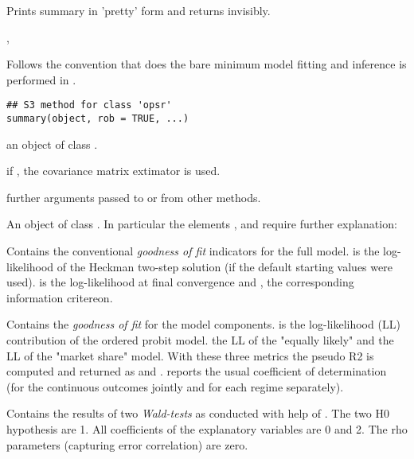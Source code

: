 \documentclass[letterpaper]{book}
\begin{document}
%
\begin{Value}
Prints summary in 'pretty' form and returns  invisibly.
\end{Value}
%
\begin{SeeAlso}
, 
\end{SeeAlso}
%
\begin{Description}
Follows the convention that  does the bare minimum model fitting and
inference is performed in .
\end{Description}
%
\begin{Usage}
\begin{verbatim}
## S3 method for class 'opsr'
summary(object, rob = TRUE, ...)
\end{verbatim}
\end{Usage}
%
\begin{Arguments}
\begin{ldescription}
\item[\code{object}] an object of class .

\item[\code{rob}] if , the  covariance matrix extimator is used.

\item[\code{...}] further arguments passed to or from other methods.
\end{ldescription}
\end{Arguments}
%
\begin{Value}
An object of class .
In particular the elements ,  and  require further
explanation:
\begin{ldescription}
\item[\code{GOF}] Contains the conventional \emph{goodness of fit} indicators for the full
model.  is the log-likelihood of the Heckman two-step solution (if
the default starting values were used).  is the log-likelihood at
final convergence and ,  the corresponding information critereon.
\item[\code{GOFcomponents}] Contains the \emph{goodness of fit}  for the model components.
 is the log-likelihood (LL) contribution of the ordered probit model.
 the LL of the "equally likely" and  the LL of the
"market share" model. With these three metrics the pseudo R2 is computed and
returned as  and .  reports the usual coefficient
of determination (for the continuous outcomes jointly and for each regime
separately).
\item[\code{wald}] Contains the results of two \emph{Wald-tests} as conducted with help
of . The two H0 hypothesis are 1. All coefficients
of the explanatory variables are 0 and 2. The rho parameters (capturing error
correlation) are zero.
\end{ldescription}
\end{Value}
\end{document}
